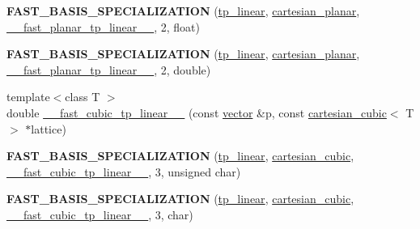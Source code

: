 \begin{DoxyCompactItemize}
\item 
\mbox{\label{namespacesisl_a73583c8d98b61ea4e01b1c8418765e82}} 
{\bfseries F\+A\+S\+T\+\_\+\+B\+A\+S\+I\+S\+\_\+\+S\+P\+E\+C\+I\+A\+L\+I\+Z\+A\+T\+I\+ON} (\hyperlink{classsisl_1_1tp__linear}{tp\+\_\+linear}, \hyperlink{classsisl_1_1cartesian__planar}{cartesian\+\_\+planar}, \hyperlink{namespacesisl_a7295912c88c93a730de6a93f9bfff854}{\+\_\+\+\_\+fast\+\_\+planar\+\_\+tp\+\_\+linear\+\_\+\+\_\+}, 2, float)
\item 
\mbox{\label{namespacesisl_a6226cce64b0dc23d509ea87b3953d04d}} 
{\bfseries F\+A\+S\+T\+\_\+\+B\+A\+S\+I\+S\+\_\+\+S\+P\+E\+C\+I\+A\+L\+I\+Z\+A\+T\+I\+ON} (\hyperlink{classsisl_1_1tp__linear}{tp\+\_\+linear}, \hyperlink{classsisl_1_1cartesian__planar}{cartesian\+\_\+planar}, \hyperlink{namespacesisl_a7295912c88c93a730de6a93f9bfff854}{\+\_\+\+\_\+fast\+\_\+planar\+\_\+tp\+\_\+linear\+\_\+\+\_\+}, 2, double)
\item 
{\footnotesize template$<$class T $>$ }\\double \hyperlink{namespacesisl_a41665c7664aae419e4fa4154c7b2acc8}{\+\_\+\+\_\+fast\+\_\+cubic\+\_\+tp\+\_\+linear\+\_\+\+\_\+} (const \hyperlink{namespacesisl_a2069bd5374a9be042ff3ce3306d41e1a}{vector} \&p, const \hyperlink{classsisl_1_1cartesian__cubic}{cartesian\+\_\+cubic}$<$ T $>$ $\ast$lattice)
\item 
\mbox{\label{namespacesisl_a736191041ea567e08ff434e0f91efc88}} 
{\bfseries F\+A\+S\+T\+\_\+\+B\+A\+S\+I\+S\+\_\+\+S\+P\+E\+C\+I\+A\+L\+I\+Z\+A\+T\+I\+ON} (\hyperlink{classsisl_1_1tp__linear}{tp\+\_\+linear}, \hyperlink{classsisl_1_1cartesian__cubic}{cartesian\+\_\+cubic}, \hyperlink{namespacesisl_a41665c7664aae419e4fa4154c7b2acc8}{\+\_\+\+\_\+fast\+\_\+cubic\+\_\+tp\+\_\+linear\+\_\+\+\_\+}, 3, unsigned char)
\item 
\mbox{\label{namespacesisl_a6d532da6f321398da173dc4df88e60bc}} 
{\bfseries F\+A\+S\+T\+\_\+\+B\+A\+S\+I\+S\+\_\+\+S\+P\+E\+C\+I\+A\+L\+I\+Z\+A\+T\+I\+ON} (\hyperlink{classsisl_1_1tp__linear}{tp\+\_\+linear}, \hyperlink{classsisl_1_1cartesian__cubic}{cartesian\+\_\+cubic}, \hyperlink{namespacesisl_a41665c7664aae419e4fa4154c7b2acc8}{\+\_\+\+\_\+fast\+\_\+cubic\+\_\+tp\+\_\+linear\+\_\+\+\_\+}, 3, char)
\item 
\mbox{\label{namespacesisl_a3585cd21b92e4cb2331f3bb2bd841344}} 

\end{DoxyCompactItemize}
